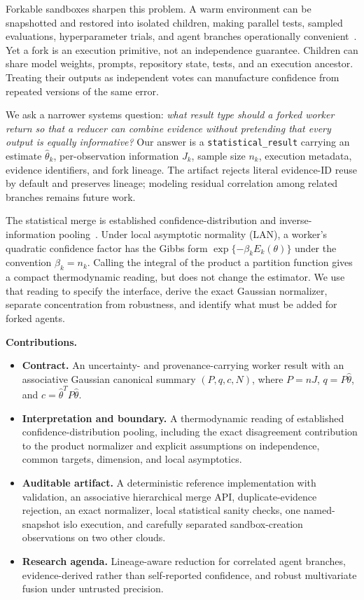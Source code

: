Forkable sandboxes sharpen this problem. A warm environment can be snapshotted and restored into isolated children, making parallel tests, sampled evaluations, hyperparameter trials, and agent branches operationally convenient~\cite{agache2020firecracker,ustiugov2021reap,morph2024}. Yet a fork is an execution primitive, not an independence guarantee. Children can share model weights, prompts, repository state, tests, and an execution ancestor. Treating their outputs as independent votes can manufacture confidence from repeated versions of the same error.

We ask a narrower systems question: \emph{what result type should a forked worker return so that a reducer can combine evidence without pretending that every output is equally informative?} Our answer is a \texttt{statistical\_result} carrying an estimate $\hat\theta_k$, per-observation information $J_k$, sample size $n_k$, execution metadata, evidence identifiers, and fork lineage. The artifact rejects literal evidence-ID reuse by default and preserves lineage; modeling residual correlation among related branches remains future work.

The statistical merge is established confidence-distribution and inverse-information pooling~\cite{singh2005combining,tang2020distributed,zhou2017raocd}. Under local asymptotic normality (LAN), a worker's quadratic confidence factor has the Gibbs form $\exp\{-\beta_k E_k(\theta)\}$ under the convention $\beta_k=n_k$. Calling the integral of the product a partition function gives a compact thermodynamic reading, but does not change the estimator. We use that reading to specify the interface, derive the exact Gaussian normalizer, separate concentration from robustness, and identify what must be added for forked agents.

\noindent\textbf{Contributions.}
\begin{itemize}
  \item \textbf{Contract.} An uncertainty- and provenance-carrying worker result with an associative Gaussian canonical summary $(P,q,c,N)$, where $P=nJ$, $q=P\hat\theta$, and $c=\hat\theta^TP\hat\theta$.
  \item \textbf{Interpretation and boundary.} A thermodynamic reading of established confidence-distribution pooling, including the exact disagreement contribution to the product normalizer and explicit assumptions on independence, common targets, dimension, and local asymptotics.
  \item \textbf{Auditable artifact.} A deterministic reference implementation with validation, an associative hierarchical merge API, duplicate-evidence rejection, an exact normalizer, local statistical sanity checks, one named-snapshot islo execution, and carefully separated sandbox-creation observations on two other clouds.
  \item \textbf{Research agenda.} Lineage-aware reduction for correlated agent branches, evidence-derived rather than self-reported confidence, and robust multivariate fusion under untrusted precision.
\end{itemize}

